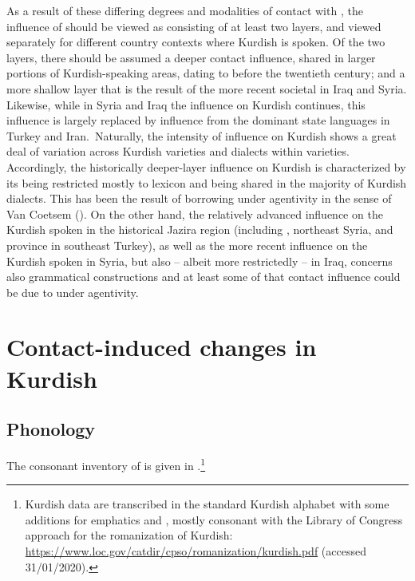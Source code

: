 \documentclass[output=paper]{langsci/langscibook}
\begin{document}
As a result of these differing degrees and modalities of contact with , the influence of  should be viewed as consisting of at least two layers, and viewed separately for different country contexts where Kurdish is spoken. Of the two layers, there should be assumed a deeper contact influence, shared in larger portions of Kurdish-speaking areas, dating to before the twentieth century; and a more shallow layer that is the result of the more recent societal  in Iraq and Syria. Likewise, while in Syria and Iraq the  influence on Kurdish continues, this influence is largely replaced by influence from the dominant state languages in Turkey and Iran.~Naturally, the intensity of  influence on Kurdish shows a great deal of variation across Kurdish varieties and dialects within varieties. Accordingly, the historically deeper-layer  influence on Kurdish is characterized by its being restricted mostly to lexicon and being shared in the majority of Kurdish dialects. This has been the result of borrowing under  agentivity in the sense of Van Coetsem (\citeyear{VanCoetsem1988,VanCoetsem2000}). On the other hand, the relatively advanced  influence on the Kurdish spoken in the historical Jazira region (including , northeast Syria, and  province in southeast Turkey), as well as the more recent  influence on the Kurdish spoken in Syria, but also – albeit more restrictedly – in Iraq, concerns also grammatical constructions and at least some of that contact influence could be due to  under  agentivity.    

\section{Contact-induced changes in Kurdish} 

\subsection{\label{bkm:Ref14688184}Phonology}

The consonant inventory of  is given in .\footnote{Kurdish data are transcribed in the standard Kurdish  alphabet with some additions for emphatics and , mostly consonant with the Library of Congress approach for the romanization of Kurdish: \url{https://www.loc.gov/catdir/cpso/romanization/kurdish.pdf} (accessed 31/01/2020).} 
\end{document}
